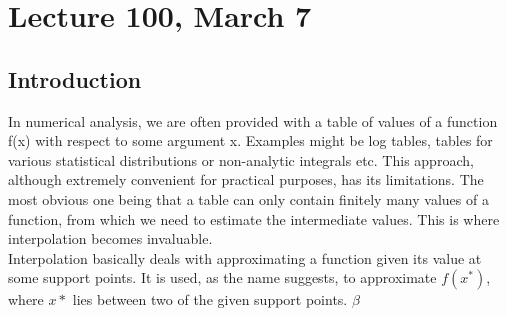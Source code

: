 \chapter*{Lecture 100, March 7}
\setcounter{chapter}{4}
\setcounter{section}{0}

\section{Introduction}

In numerical analysis, we are often provided with a table of values of a function f(x) with respect to some argument x. Examples might be log tables, tables for various statistical distributions or non-analytic integrals etc. This approach, although extremely convenient for practical purposes, has its limitations. The most obvious one being that a table can only contain finitely many values of a function, from which we need to estimate the intermediate values. This is where interpolation becomes invaluable.\\
Interpolation basically deals with approximating a function given its value at some support points. It is used, as the name suggests, to approximate $f(x^*)$, where $x*$ lies between two of the given support points. $\beta$
